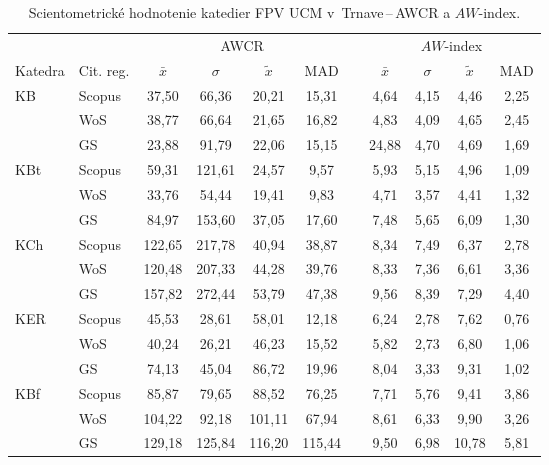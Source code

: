 \begin{table}
  \centering\small
  \caption[Hodnotenie FPV\,--\,AWCR a $AW$-index]%
  {Scientometrické hodnotenie katedier FPV UCM v~Trnave\,--\,AWCR a $AW$-index.}
  \label{tab:5-staff.results}
  \begin{tabularx}{\textwidth}{Xlcccclcccc}
    \toprule
    & & \multicolumn{4}{c}{AWCR} & & \multicolumn{4}{c}{$AW$-index} \\
    \cmidrule{3-6}\cmidrule{8-11}
    Katedra & Cit. reg. & $\bar{x}$ & $\sigma$ & $\tilde{x}$ & MAD & & $\bar{x}$ & $\sigma$ & $\tilde{x}$ & MAD \\[0.3ex]
    \midrule
    KB   & Scopus & 37,50  & 66,36  & 20,21  & 15,31  & & 4,64  & 4,15 & 4,46  & 2,25 \\
         & WoS    & 38,77  & 66,64  & 21,65  & 16,82  & & 4,83  & 4,09 & 4,65  & 2,45 \\
         & GS     & 23,88  & 91,79  & 22,06  & 15,15  & & 24,88 & 4,70 & 4,69  & 1,69 \\[1ex]
    KBt  & Scopus & 59,31  & 121,61 & 24,57  & 9,57   & & 5,93  & 5,15 & 4,96  & 1,09 \\
         & WoS    & 33,76  & 54,44  & 19,41  & 9,83   & & 4,71  & 3,57 & 4,41  & 1,32 \\
         & GS     & 84,97  & 153,60 & 37,05  & 17,60  & & 7,48  & 5,65 & 6,09  & 1,30 \\[1ex]
    KCh  & Scopus & 122,65 & 217,78 & 40,94  & 38,87  & & 8,34  & 7,49 & 6,37  & 2,78 \\
         & WoS    & 120,48 & 207,33 & 44,28  & 39,76  & & 8,33  & 7,36 & 6,61  & 3,36 \\
         & GS     & 157,82 & 272,44 & 53,79  & 47,38  & & 9,56  & 8,39 & 7,29  & 4,40 \\[1ex]
    KER  & Scopus & 45,53  & 28,61  & 58,01  & 12,18  & & 6,24  & 2,78 & 7,62  & 0,76 \\
         & WoS    & 40,24  & 26,21  & 46,23  & 15,52  & & 5,82  & 2,73 & 6,80  & 1,06 \\
         & GS     & 74,13  & 45,04  & 86,72  & 19,96  & & 8,04  & 3,33 & 9,31  & 1,02 \\[1ex]
    KBf  & Scopus & 85,87  & 79,65  & 88,52  & 76,25  & & 7,71  & 5,76 & 9,41  & 3,86 \\
         & WoS    & 104,22 & 92,18  & 101,11 & 67,94  & & 8,61  & 6,33 & 9,90  & 3,26 \\
         & GS     & 129,18 & 125,84 & 116,20 & 115,44 & & 9,50  & 6,98 & 10,78 & 5,81 \\[1ex]

\end{tabularx}
\end{table}
